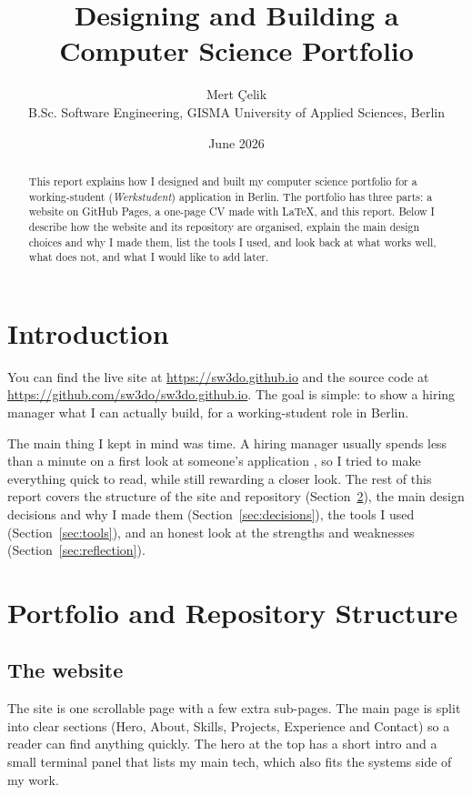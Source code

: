 \documentclass[11pt,a4paper]{article}
\title{\textbf{Designing and Building a Computer Science Portfolio}}
\author{Mert \textcolor{accent}{Çelik}\\[2pt]
  \small B.Sc. Software Engineering, GISMA University of Applied Sciences, Berlin}
\date{June 2026}
\begin{document}
\maketitle

\begin{abstract}
\noindent This report explains how I designed and built my computer science portfolio for a working-student (\textit{Werkstudent}) application in Berlin. The portfolio has three parts: a website on GitHub Pages, a one-page CV made with \LaTeX{}, and this report. Below I describe how the website and its repository are organised, explain the main design choices and why I made them, list the tools I used, and look back at what works well, what does not, and what I would like to add later.
\end{abstract}

\section{Introduction}
You can find the live site at \url{https://sw3do.github.io} and the source code at \url{https://github.com/sw3do/sw3do.github.io}. The goal is simple: to show a hiring manager what I can actually build, for a working-student role in Berlin.

The main thing I kept in mind was time. A hiring manager usually spends less than a minute on a first look at someone's application \citep{pestoPortfolio}, so I tried to make everything quick to read, while still rewarding a closer look. The rest of this report covers the structure of the site and repository (Section~\ref{sec:structure}), the main design decisions and why I made them (Section~\ref{sec:decisions}), the tools I used (Section~\ref{sec:tools}), and an honest look at the strengths and weaknesses (Section~\ref{sec:reflection}).

\section{Portfolio and Repository Structure}
\label{sec:structure}

\subsection{The website}
The site is one scrollable page with a few extra sub-pages. The main page is split into clear sections (Hero, About, Skills, Projects, Experience and Contact) so a reader can find anything quickly. The hero at the top has a short intro and a small terminal panel that lists my main tech, which also fits the systems side of my work.
\end{document}
